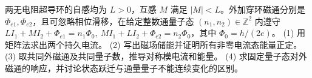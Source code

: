 两无电阻超导环的自感均为 \(L>0\)，互感 \(M\) 满足 \(|M|<L\)。外加穿环磁通分别是 \(\Phi_{e1},\Phi_{e2}\)，且可忽略相位滑移，在给定整数通量子态 \((n_1,n_2)\in\mathbb Z^2\) 内遵守 \(LI_1+MI_2+\Phi_{e1}=n_1\Phi_0,\ MI_1+LI_2+\Phi_{e2}=n_2\Phi_0\)，其中 \(\Phi_0=h/(2e)\)。
(1) 用矩阵法求出两个持久电流。
(2) 写出磁场储能并证明所有非零电流态能量正定。
(3) 取共同外磁通及共同量子数，推导对称模电流和能量。
(4) 求固定量子态对外磁通的响应，并讨论状态跃迁与通量量子不能连续变化的区别。

